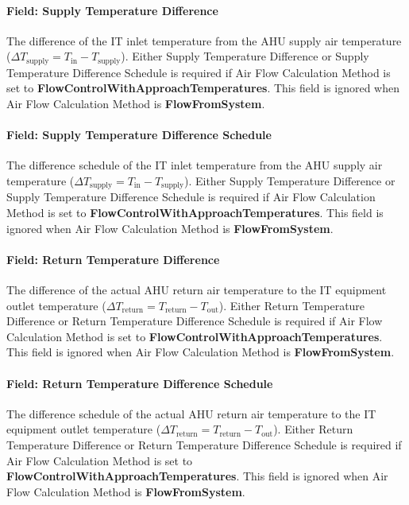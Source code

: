 \paragraph{Field: Supply Temperature Difference}\label{field-supply-temperature-difference}

The difference of the IT inlet temperature from the AHU supply air temperature (${\Delta}T_{\textrm{supply}} = T_{\textrm{in}}-T_{\textrm{supply}}$). Either Supply Temperature Difference or Supply Temperature Difference Schedule is required if Air Flow Calculation Method is set to \textbf{FlowControlWithApproachTemperatures}. This field is ignored when Air Flow Calculation Method is \textbf{FlowFromSystem}.

\paragraph{Field: Supply Temperature Difference Schedule}\label{field-supply-temperature-difference-schedule}

The difference schedule of the IT inlet temperature from the AHU supply air temperature (${\Delta}T_{\textrm{supply}} = T_{\textrm{in}}-T_{\textrm{supply}}$). Either Supply Temperature Difference or Supply Temperature Difference Schedule is required if Air Flow Calculation Method is set to \textbf{FlowControlWithApproachTemperatures}. This field is ignored when Air Flow Calculation Method is \textbf{FlowFromSystem}.

\paragraph{Field: Return Temperature Difference}\label{field-return-temperature-difference}

The difference of the actual AHU return air temperature to the IT equipment outlet temperature (${\Delta}T_{\textrm{return}} = T_{\textrm{return}}-T_{\textrm{out}}$). Either Return Temperature Difference or Return Temperature Difference Schedule is required if Air Flow Calculation Method is set to \textbf{FlowControlWithApproachTemperatures}. This field is ignored when Air Flow Calculation Method is \textbf{FlowFromSystem}.

\paragraph{Field: Return Temperature Difference Schedule}\label{field-return-temperature-difference-schedule}

The difference schedule of the actual AHU return air temperature to the IT equipment outlet temperature (${\Delta}T_{\textrm{return}} = T_{\textrm{return}}-T_{\textrm{out}}$). Either Return Temperature Difference or Return Temperature Difference Schedule is required if Air Flow Calculation Method is set to \textbf{FlowControlWithApproachTemperatures}. This field is ignored when Air Flow Calculation Method is \textbf{FlowFromSystem}.

